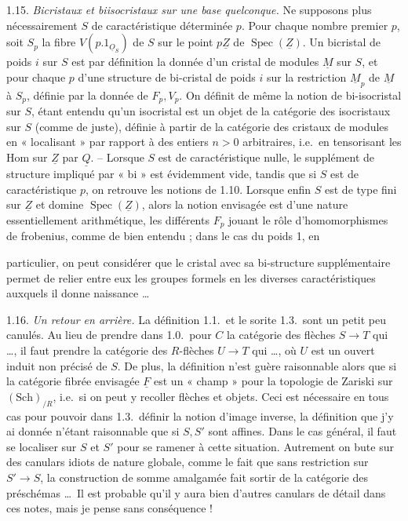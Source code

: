 \documentclass[11pt,a4paper]{article}
\begin{document}
1.15. \emph{Bicristaux et biisocristaux sur une base quelconque.} Ne supposons
plus nécessairement $S$ de caractéristique déterminée $p$. Pour chaque nombre
premier $p$, soit $S_p$ la fibre $V(p.1_{\underline{O}_S})$ de $S$ sur le point
$p\underline{Z}$ de $\operatorname{Spec}(\underline{Z})$. Un bicristal de poids
$i$ sur $S$ est par définition la donnée d'un cristal de modules
$\underline{M}$ sur $S$, et pour chaque $p$ d'une structure de bi-cristal de
poids $i$ sur la restriction $\underline{M}_p$ de $\underline{M}$ à $S_p$,
définie par la donnée de $F_p,V_p$. On définit de même la notion de
bi-isocristal sur $S$, étant entendu qu'un isocristal est un objet de la
catégorie des isocristaux sur $S$ (comme de juste), définie à partir de la
catégorie des cristaux de modules en « localisant » par rapport à des entiers
$n>0$ arbitraires, i.e.\ en tensorisant les Hom sur $\underline{Z}$ par
$\underline{Q}$. -- Lorsque $S$ est de caractéristique nulle, le supplément de
structure impliqué par « bi » est évidemment vide, tandis que si $S$ est de
caractéristique $p$, on retrouve les notions de 1.10. Lorsque enfin $S$ est de
type fini sur $\underline{Z}$ et domine $\operatorname{Spec}(\underline{Z})$,
alors la notion envisagée est d'une nature essentiellement arithmétique, les
différents $F_p$ jouant le rôle d'homomorphismes de frobenius, comme de bien
entendu ; dans le cas du poids 1, en

particulier, on peut considérer que le cristal avec sa bi-structure
supplémentaire permet de relier entre eux les groupes formels en les diverses
caractéristiques auxquels il donne naissance \ldots

1.16. \emph{Un retour en arrière.} La définition 1.1.\ et le sorite 1.3.\ sont
un petit peu canulés. Au lieu de prendre dans 1.0.\ pour $C$ la catégorie des
flèches $S\to T$ qui \ldots, il faut prendre la catégorie des
$R$-flèches $U\to T$ qui \ldots, où $U$ est un ouvert induit non précisé de
$S$. De plus, la définition n'est guère raisonnable alors que si la catégorie
fibrée envisagée $\underline{F}$ est un « champ » pour la topologie de Zariski
sur $(\mathrm{Sch})_{/R}$, i.e.\ si on peut y recoller flèches et objets. Ceci
est nécessaire en tous cas pour pouvoir dans 1.3.\ définir la notion d'image
inverse, la définition que j'y ai donnée n'étant raisonnable que si $S,S'$ sont
affines. Dans le cas général, il faut se localiser sur $S$ et $S'$ pour se
ramener à cette situation. Autrement on bute sur des canulars idiots de nature
globale, comme le fait que sans restriction sur $S'\to S$, la construction
  de somme amalgamée fait sortir de la
catégorie des préschémas \ldots\ Il est probable qu'il y aura bien d'autres
canulars de détail dans ces notes, mais\add{,} je pense\add{,} sans
conséquence !
\end{document}
